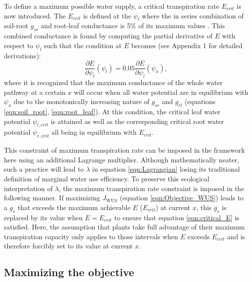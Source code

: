 \documentclass[utf8]{frontiersSCNS} %
\begin{document}
To define a maximum possible water supply, a critical transpiration rate $E_{crit}$ is now introduced. The $E_{crit}$ is defined at the $\psi_l$ where the in series combination of soil-root $g_{sr}$ and root-leaf conductance is 5\% of its maximum values \citep{sperry_predicting_2017}. This combined conductance is found by computing the partial derivative of $E$ with respect to $\psi_l$ such that the condition at $E$ becomes (see Appendix 1 for detailed derivations):
\begin{equation}
    \label{eqn:critical_E}
    \frac{\partial E}{\partial \psi_l} (\psi_l) = 0.05 \frac{\partial E}{\partial \psi_l} (\psi_x),
\end{equation}
where it is recognized that the maximum conductance of the whole water pathway at a certain $x$ will occur when all water potential are in equilibrium with $\psi_x$ due to the monotonically increasing nature of $g_{sr}$ and $g_{rl}$ (equations \ref{eqn:soil_root}, \ref{eqn:root_leaf}). At this condition, the critical leaf water potential $\psi_{l,crit}$ is attained as well as the corresponding critical root water potential $\psi_{r,crit}$ all being in equilibrium with $E_{crit}$.

This constraint of maximum transpiration rate can be imposed in the framework here using an additional Lagrange multiplier. Although mathematically neater, such a practice will lead to $\lambda$ in equation \ref{eqn:Lagrangian} losing its traditional definition of marginal water use efficiency. To preserve this ecological interpretation of $\lambda$, the maximum transpiration rate constraint is imposed in the following manner.  If maximizing $J_{\text{WUS}}$ (equation \ref{eqn:Objective_WUS}) leads to a $g_s$ that exceeds the maximum achievable $E$ ($E_{crit}$) at current $x$, this $g_s$ is replaced by its value when $E = E_{crit}$ to ensure that equation \ref{eqn:critical_E} is satisfied. Here, the assumption that plants take full advantage of their maximum transpiration capacity only applies to those intervals when $E$ exceeds $E_{crit}$ and is therefore forcibly set to its value at current $x$.

\subsection{Maximizing the objective}
\end{document}
